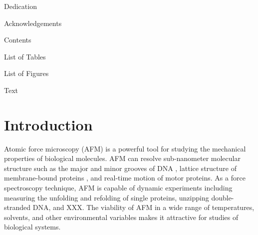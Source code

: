 \documentclass[%
  aip,12pt,tightenlines,
  amsthm,
 amsmath,amssymb
]{article}
\newcommand{\sLabel}[1]{\label{section:#1}}
\newcommand{\firstp}[0]{}
\newcommand{\pl}[0]{\vspace{6pt}}
\newcommand{\citePRH}[1]{\cite{#1}}
\begin{document}
\clearpage

Dedication

\clearpage

Acknowledgements

\clearpage

Contents

\tableofcontents

\clearpage

List of Tables 

\listoftables


\clearpage

List of Figures 

 
\listoffigures
 

\clearpage

Text


\maketitle

\doublespacing

\section{\sLabel{Intro}Introduction}

\firstp Atomic force microscopy (AFM) is a powerful tool for studying the mechanical properties of biological molecules.  AFM can resolve sub-nanometer molecular structure such as the major and minor grooves of DNA \citePRH{ido_beyond_2013}, lattice structure of membrane-bound proteins \citePRH{muller_surface_1999}, and real-time motion of motor proteins\citePRH{ando_high-speed_2007}. As a force spectroscopy technique, AFM is capable of dynamic experiments including measuring the unfolding and refolding of single proteins\citePRH{he_direct_2015}, unzipping double-stranded DNA\citePRH{krautbauer_Unzipping_2003}, and XXX. The viability of AFM in a wide range of temperatures, solvents, and other environmental variables makes it attractive for studies of biological systems. \pl
\end{document}
